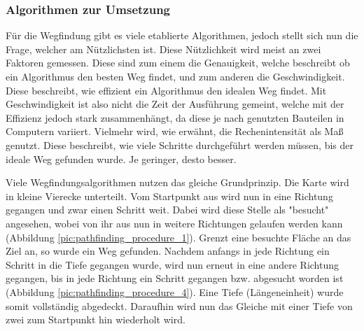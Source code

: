 {{{		\subsubsection{Algorithmen zur Umsetzung}
		{
			Für die Wegfindung gibt es viele etablierte Algorithmen, jedoch stellt sich nun die Frage, welcher am Nützlichsten ist. Diese Nützlichkeit wird meist an zwei Faktoren gemessen. Diese sind zum einem die Genauigkeit, welche beschreibt ob ein Algorithmus den besten Weg findet, und zum anderen die Geschwindigkeit. Diese beschreibt, wie effizient ein Algorithmus den idealen Weg findet. Mit Geschwindigkeit ist also nicht die Zeit der Ausführung gemeint, welche mit der Effizienz jedoch stark zusammenhängt, da diese je nach genutzten Bauteilen in Computern variiert. Vielmehr wird, wie erwähnt, die Rechenintensität als Maß genutzt. Diese beschreibt, wie viele Schritte durchgeführt werden müssen, bis der ideale Weg gefunden wurde. Je geringer, desto besser. 
			
			Viele Wegfindungsalgorithmen nutzen das gleiche Grundprinzip. Die Karte wird in kleine Vierecke unterteilt. Vom Startpunkt aus wird nun in eine Richtung gegangen und zwar einen Schritt weit. Dabei wird diese Stelle als "besucht" angesehen, wobei von ihr aus nun in weitere Richtungen gelaufen werden kann (Abbildung \ref{pic:pathfinding_procedure_1}). Grenzt eine besuchte Fläche an das Ziel an, so wurde ein Weg gefunden. Nachdem anfangs in jede Richtung ein Schritt in die Tiefe gegangen wurde, wird nun erneut in eine andere Richtung gegangen, bis in jede Richtung ein Schritt gegangen bzw. abgesucht worden ist (Abbildung \ref{pic:pathfinding_procedure_4}). Eine Tiefe (Längeneinheit) wurde somit vollständig abgedeckt. Daraufhin wird nun das Gleiche mit einer Tiefe von zwei zum Startpunkt hin wiederholt wird.
			
}}}}
